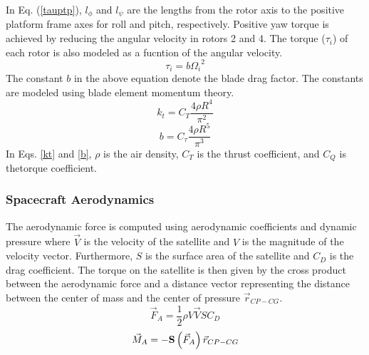 In Eq. (\ref{tauptp}), $l_{\phi}$ and $l_{\psi}$ are the lengths from the rotor axis to the positive platform frame axes for roll and pitch, respectively. Positive yaw torque is achieved by reducing the angular velocity in rotors 2 and 4.  The torque ($\tau_i$) of each rotor is also modeled as a fucntion of the angular velocity.
\begin{equation}
\tau_{i} = b{\Omega_{i}}^{2}
\label{taui}
\end{equation}
The constant $b$ in the above equation denote the blade drag factor. The constants are modeled using blade element momentum theory\cite{swingload}. 
\begin{equation}
k_{t} = C_{T}\frac{4\rho {R}^{4}}{{\pi}^{2}}
\label{kt}
\end{equation}
\begin{equation}
b = C_{\tau}\frac{4\rho {R}^{5}}{{\pi}^{3}}
\label{b}
\end{equation}
In Eqs. \ref{kt} and \ref{b}, $\rho$ is the air density, $C_{T}$ is the thrust coefficient, and $C_{Q}$ is thetorque coefficient. 

\subsubsection{Spacecraft Aerodynamics}

The aerodynamic force is computed using aerodynamic coefficients and
dynamic pressure where $\vec{V}$ is the velocity of the satellite and
$V$ is the magnitude of the velocity vector. Furthermore, $S$ is the
surface area of the satellite and $C_D$ is the drag coefficient. The
torque on the satellite is then given by the cross product between the
aerodynamic force and a distance vector representing the distance
between the center of mass and the center of pressure
$\vec{r}_{CP-CG}$.
\begin{equation}
  \vec{F}_A = \frac{1}{2}\rho V\vec{V}S C_D
\end{equation}
\begin{equation}
    \vec{M}_A = -{\bf S}\left(\vec{F}_A\right)\vec{r}_{CP-CG}
\end{equation}
